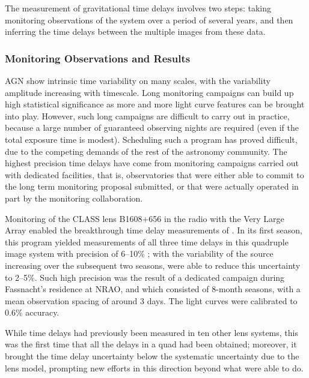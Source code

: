 The measurement of gravitational time delays involves two steps:  taking
monitoring observations of the system over a period of several years,
and then inferring the time delays between the multiple images from
these data.


\subsubsection{Monitoring Observations and Results}

AGN show intrinsic time variability on many scales, with the variability
amplitude increasing  with timescale. Long monitoring campaigns can
build up high statistical  significance as more and more light curve
features can be brought into play.  However, such long campaigns are
difficult to carry out in practice,  because a large number of
guaranteed observing nights are required (even if the total exposure
time is modest). Scheduling such a program has proved difficult, due to
the  competing demands of the rest of the astronomy community. The
highest precision  time delays have come from monitoring campaigns
carried out with dedicated facilities, that is, observatories that were
either able to commit to the long term monitoring proposal submitted, or
that were actually operated in part by the monitoring collaboration.


Monitoring of the CLASS lens B1608$+$656 in the radio with the Very
Large Array enabled the breakthrough  time delay measurements of
\citep{Fas++02}. In its first season, this program  yielded measurements
of all three time delays in this quadruple image system with  precision
of 6--10\% \citep{Fas++99}; with the variability of the source
increasing over the subsequent two seasons, \citep{Fas++02} were able to
reduce this uncertainty to 2--5\%. Such high precision was the result of
a dedicated campaign during Fassnacht's residence at NRAO, and which
consisted of 8-month seasons, with a mean observation spacing of around
3 days. The light curves were calibrated to 0.6\% accuracy.

While time delays had previously been measured in ten other lens
systems, this was the first time that all  the delays in a quad had been
obtained; moreover, it brought the time  delay uncertainty below the
systematic uncertainty due to the lens model,  prompting new efforts in
this direction beyond what \citep{K+F99} were able to do.


